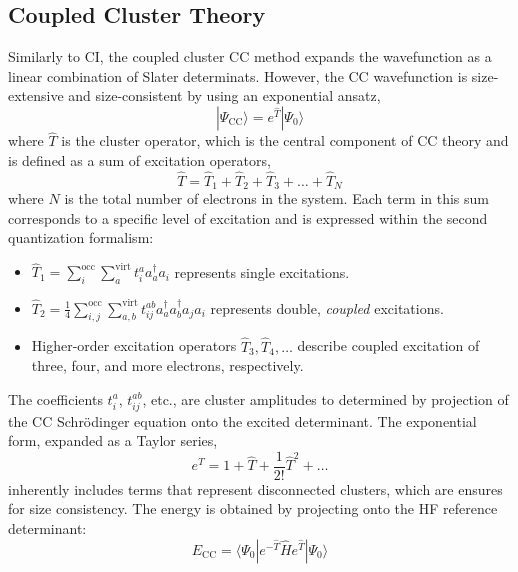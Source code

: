 \subsection{Coupled Cluster Theory} \label{sec:CCTheory}
Similarly to CI, the coupled cluster CC method expands the wavefunction as a linear combination of Slater determinats. However, the CC wavefunction is size-extensive and size-consistent by using an exponential ansatz,
\begin{equation}\label{eq:CCWavenfunc}
    | \Psi_{\mathrm{CC}} \rangle = e^{\hat{T}} | \Psi_{0} \rangle
\end{equation}
where $\hat{T}$ is the cluster operator, which is the central component of CC theory and is defined as a sum of excitation operators,
\begin{equation}
    \hat{T} = \hat{T}_1 + \hat{T}_2 + \hat{T}_3 + \dots + \hat{T}_N
\end{equation}
where $N$ is the total number of electrons in the system. Each term in this sum corresponds to a specific level of excitation and is expressed within the second quantization formalism:
\begin{itemize}
    \item $\hat{T}_1 = \sum_{i}^{\text{occ}} \sum_{a}^{\text{virt}} t_i^a a_a^{\dagger} a_i$ represents single excitations.
    \item $\hat{T}_2 = \frac{1}{4} \sum_{i,j}^{\text{occ}} \sum_{a,b}^{\text{virt}} t_{ij}^{ab} a_a^{\dagger} a_b^{\dagger} a_j a_i$ represents double, \textit{coupled} excitations.
    \item Higher-order excitation operators $\hat{T}_3, \hat{T}_4, \dots$ describe coupled excitation of three, four, and more electrons, respectively.
\end{itemize}
The coefficients $t_i^a$, $t_{ij}^{ab}$, etc., are cluster amplitudes to determined by projection of the CC Schr\"{o}dinger equation onto the excited determinant. The exponential form, expanded as a Taylor series,
\begin{equation}
    e^{\hat{T}} = 1 + \hat{T} + \frac{1}{2!} \hat{T}^2 + \dots
\end{equation}
inherently includes terms that represent disconnected clusters, which are ensures for size consistency. The energy is obtained by projecting onto the HF reference determinant:
\begin{equation}\label{eq:CCEnergy}
    E_{\mathrm{CC}}=\langle \Psi_{0} | e^{-\hat{T}} \hat{H} e^{\hat{T}} | \Psi_{0} \rangle
\end{equation}
